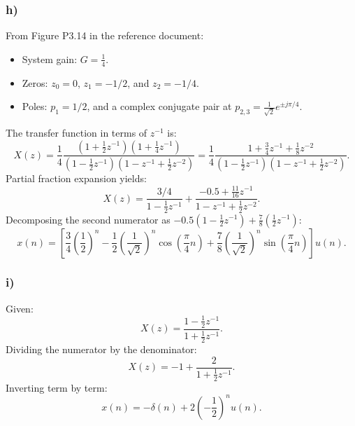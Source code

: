 \documentclass[12pt,a4paper]{article}
\begin{document}
\subsubsection*{h)}
From Figure P3.14 in the reference document:
\begin{itemize}
    \item System gain: $G = \frac{1}{4}$.
    \item Zeros: $z_0 = 0$, $z_1 = -1/2$, and $z_2 = -1/4$.
    \item Poles: $p_1 = 1/2$, and a complex conjugate pair at $p_{2,3} = \frac{1}{\sqrt{2}} e^{\pm j\pi/4}$.
\end{itemize}
The transfer function in terms of $z^{-1}$ is:
\begin{equation}
    X(z) = \frac{1}{4} \frac{(1 + \frac{1}{2}z^{-1})(1 + \frac{1}{4}z^{-1})}{(1 - \frac{1}{2}z^{-1})(1 - z^{-1} + \frac{1}{2}z^{-2})} = \frac{1}{4} \frac{1 + \frac{3}{4}z^{-1} + \frac{1}{8}z^{-2}}{(1 - \frac{1}{2}z^{-1})(1 - z^{-1} + \frac{1}{2}z^{-2})}.
\end{equation}
Partial fraction expansion yields:
\begin{equation}
    X(z) = \frac{3/4}{1 - \frac{1}{2}z^{-1}} + \frac{-0.5 + \frac{11}{16}z^{-1}}{1 - z^{-1} + \frac{1}{2}z^{-2}}.
\end{equation}
Decomposing the second numerator as $-0.5(1 - \frac{1}{2}z^{-1}) + \frac{7}{8}(\frac{1}{2}z^{-1})$:
\begin{equation}
    x(n) = \left[ \frac{3}{4}\left(\frac{1}{2}\right)^n - \frac{1}{2}\left(\frac{1}{\sqrt{2}}\right)^n \cos\left(\frac{\pi}{4} n\right) + \frac{7}{8}\left(\frac{1}{\sqrt{2}}\right)^n \sin\left(\frac{\pi}{4} n\right) \right] u(n).
\end{equation}

\subsubsection*{i)}
Given:
\begin{equation}
    X(z) = \frac{1 - \frac{1}{2}z^{-1}}{1 + \frac{1}{2}z^{-1}}.
\end{equation}
Dividing the numerator by the denominator:
\begin{equation}
    X(z) = -1 + \frac{2}{1 + \frac{1}{2}z^{-1}}.
\end{equation}
Inverting term by term:
\begin{equation}
    x(n) = -\delta(n) + 2\left(-\frac{1}{2}\right)^n u(n).
\end{equation}
\end{document}
